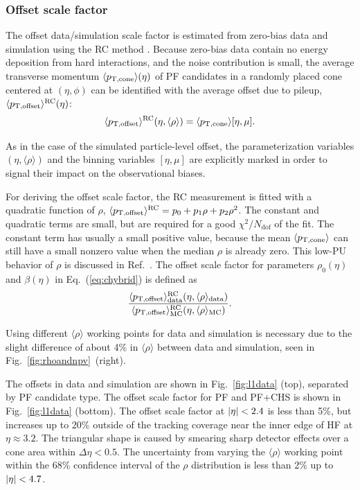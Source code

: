 \documentclass[11pt,twoside,a4paper,cmspaper,final,collab]{cms-tdr}
\begin{document}
\subsubsection*{Offset scale factor}
\label{sec:rc}\label{sec:l1res}

The offset data/simulation scale factor is estimated from zero-bias data and simulation using the RC method \cite{JEC_JINST}. Because zero-bias data contain no energy deposition from hard interactions, and the noise contribution is small, the average transverse momentum $\langle p_{\mathrm{T},\rm cone}\rangle(\eta)$ of PF candidates in a randomly placed cone centered at $(\eta,\phi)$ can be identified with the average offset due to pileup, $\langle p_{\text{T,offset}}\rangle^\mathrm{RC}(\eta)$:
\begin{equation}
\langle p_{\text{T,offset}}\rangle^\mathrm{RC}(\eta, \langle\rho\rangle) = \langle p_{\mathrm{T},\rm cone}\rangle[\eta, \mu].
\end{equation}

As in the case of the simulated particle-level offset, the parameterization variables $(\eta,\langle\rho\rangle)$ and the binning variables $[\eta, \mu]$ are explicitly marked in order to signal their impact on the observational biases.

For deriving the offset scale factor, the RC measurement is fitted with a quadratic function of $\rho$, $\langle p_{\text{T,offset}}\rangle^\mathrm{RC} = p_0 + p_1\rho + p_2\rho^2$.
The constant and quadratic terms are small, but are required for a good $\chi^{2}/N_\mathrm{dof}$ of the fit. The constant term has usually a small positive value, because the mean $\langle p_{\mathrm{T},\rm cone}\rangle$ can still have a small nonzero value when the median $\rho$ is already zero. This low-PU behavior of $\rho$ is discussed in Ref.~\cite{Chatrchyan:2012tt}.
The offset scale factor for parameters $\rho_0(\eta)$ and $\beta(\eta)$ in Eq.~(\ref{eq:chybrid}) is defined as
\begin{equation}
\frac{\langle p_{\text{T,offset}}\rangle^\mathrm{RC}_\text{data}(\eta, \langle\rho\rangle_\text{data})}
{\langle p_{\text{T,offset}}\rangle^\mathrm{RC}_\mathrm{MC}(\eta, \langle\rho\rangle_\mathrm{MC})} .
\end{equation}

Using different $\langle\rho\rangle$ working points for data and simulation is necessary due to the slight difference of about 4\% in $\langle\rho\rangle$ between data and simulation, seen in Fig.~\ref{fig:rhoandnpv}~(right).

The offsets in data and simulation are shown in Fig.~\ref{fig:l1data} (top), separated by PF candidate type. The offset scale factor for PF and PF+CHS is shown in Fig.~\ref{fig:l1data} (bottom).
The offset scale factor at $\lvert \eta \rvert<2.4$ is less than 5\%, but increases up to 20\% outside of the tracking coverage near the inner edge of HF at $\eta\approx3.2$. The triangular shape is caused by smearing sharp detector effects over a cone area within $\Delta\eta<0.5$. The uncertainty from varying the $\langle\rho\rangle$ working point within the 68\% confidence interval of the $\rho$ distribution is less than 2\% up to $\lvert \eta \rvert<4.7$.
\end{document}
